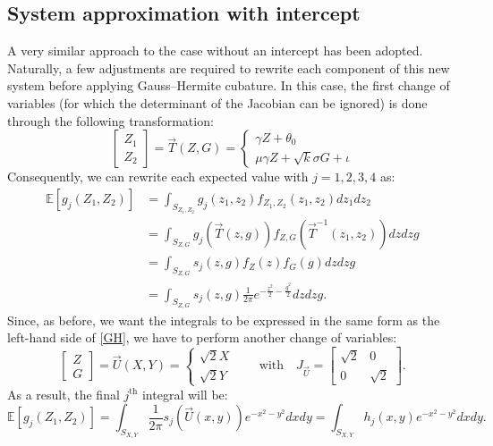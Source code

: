 \documentclass{article}
\begin{document}
\subsection{System approximation with intercept}
A very similar approach to the case without an intercept has been adopted. Naturally, a few adjustments are required to rewrite each component of this new system before applying Gauss–Hermite cubature. In this case, the first change of variables (for which the determinant of the Jacobian can be ignored) is done through the following transformation:
\begin{equation}
\begin{bmatrix}
Z_1\\
Z_2
\end{bmatrix}=\vec{T}(Z,G)=\begin{cases}
\gamma Z+\theta_0\\
\mu \gamma Z+\sqrt{k}\sigma G+\iota
\end{cases}
\label{1changeINT}
\end{equation}
Consequently, we can rewrite each expected  value with $j = 1,2,3,4$ as:
\begin{align*}
\mathbb{E}[g_j(Z_1,Z_2)]&= \int_{S_{Z_1,Z_2}}g_j(z_1,z_2)f_{Z_1,Z_2}(z_1,z_2)dz_1dz_2\\
&=\int_{S_{Z,G}}g_j(\vec{T}(z,g))f_{Z,G}(\vec{T}^{-1}(z_1,z_2))dzdzg\\
&=\int_{S_{Z,G}}s_j(z,g)f_{Z}(z)f_{G}(g)dzdzg\\
&=\int_{S_{Z,G}}s_j(z,g)\frac{1}{2\pi}e^{\displaystyle-\frac{z^2}{2}-\frac{g^2}{2}}dzdzg.
\end{align*}
Since, as before, we want the integrals to be expressed in the same form as the left-hand side of \eqref{GH}, we have to perform another change of variables:
\begin{equation}
\begin{bmatrix}
Z\\
G
\end{bmatrix}=\vec{U}(X,Y)=\begin{cases}
\sqrt{2}X\\
\sqrt{2}Y
\end{cases}\qquad \text{with}\quad J_{\vec{U}}=\begin{bmatrix}
\sqrt{2} & 0 \\
0 & \sqrt{2}
\end{bmatrix}.
\label{2changeINT}
\end{equation}
As a result, the final $j^{\text{th}}$ integral will be:
\begin{equation*}
\mathbb{E}[g_j(Z_1,Z_2)]=\int_{S_{X,Y}}\frac{1}{2\pi}s_j(\vec{U}(x,y))e^{-x^2-y^2}dxdy=\int_{S_{X,Y}}h_j(x,y) e^{-x^2-y^2}dxdy.
\end{equation*}
\end{document}
